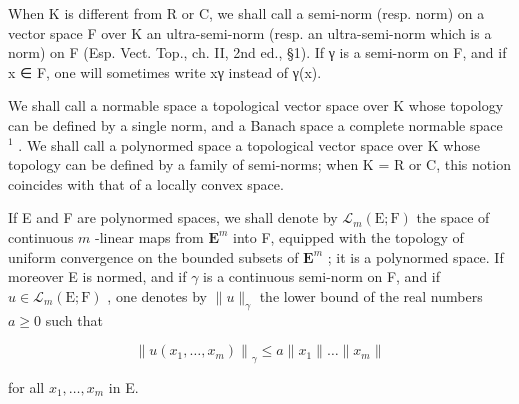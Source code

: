 
When K is different from R or C, we shall call a semi-norm (resp. norm) on a vector space F over K an ultra-semi-norm (resp. an ultra-semi-norm which is a norm) on F (Esp. Vect. Top., ch. II, 2nd ed., §1). If γ is a semi-norm on F, and if x ∈ F, one will sometimes write \textbar\textbar x\textbar\textbar γ instead of γ(x).

We shall call a normable space a topological vector space over K whose topology can be defined by a single norm, and a Banach space a complete normable space \(^{1}\) . We shall call a polynormed space a topological vector space over K whose topology can be defined by a family of semi-norms; when K = R or C, this notion coincides with that of a locally convex space.

If E and F are polynormed spaces, we shall denote by \(\mathcal{L}_{m}(\mathrm{E};\mathrm{F})\) the space of continuous \(m\) -linear maps from \(\mathbf{E}^{m}\) into F, equipped with the topology of uniform convergence on the bounded subsets of \(\mathbf{E}^{m}\) ; it is a polynormed space. If moreover E is normed, and if \(\gamma\) is a continuous semi-norm on F, and if \(u\in\mathcal{L}_{m}(\mathrm{E};\mathrm{F})\) , one denotes by \(\|u\|_{\gamma}\) the lower bound of the real numbers \(a\geqslant0\) such that

\[
\left\| u (x _ {1}, \dots , x _ {m}) \right\| _ {\gamma} \leqslant a \| x _ {1} \| \dots \| x _ {m} \|
\]

for all \(x_{1}, \ldots, x_{m}\) in E.


